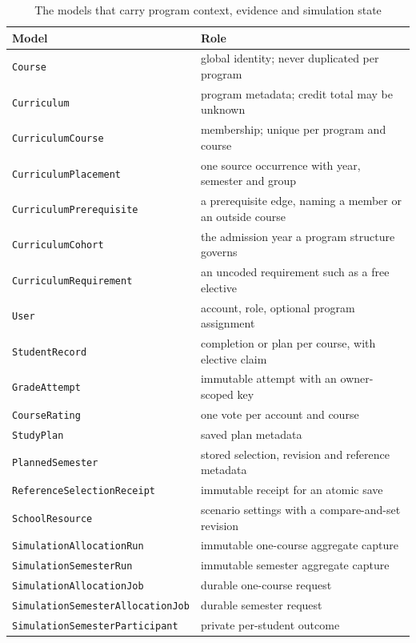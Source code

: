 \begin{table}[h]
\centering
\small
\begin{tabular}{p{}p{}}
\toprule
\textbf{Model} & \textbf{Role} \\
\midrule
{\tt Course} & global identity; never duplicated per program \\
{\tt Curriculum} & program metadata; credit total may be unknown \\
{\tt CurriculumCourse} & membership; unique per program and course \\
{\tt CurriculumPlacement} & one source occurrence with year, semester and group \\
{\tt CurriculumPrerequisite} & a prerequisite edge, naming a member or an outside course \\
{\tt CurriculumCohort} & the admission year a program structure governs \\
{\tt CurriculumRequirement} & an uncoded requirement such as a free elective \\
{\tt User} & account, role, optional program assignment \\
{\tt StudentRecord} & completion or plan per course, with elective claim \\
{\tt GradeAttempt} & immutable attempt with an owner-scoped key \\
{\tt CourseRating} & one vote per account and course \\
{\tt StudyPlan} & saved plan metadata \\
{\tt PlannedSemester} & stored selection, revision and reference metadata \\
{\tt ReferenceSelectionReceipt} & immutable receipt for an atomic save \\
{\tt SchoolResource} & scenario settings with a compare-and-set revision \\
{\tt SimulationAllocationRun} & immutable one-course aggregate capture \\
{\tt SimulationSemesterRun} & immutable semester aggregate capture \\
{\tt SimulationAllocationJob} & durable one-course request \\
{\tt SimulationSemesterAllocationJob} & durable semester request \\
{\tt SimulationSemesterParticipant} & private per-student outcome \\
\bottomrule
\end{tabular}
\caption{The models that carry program context, evidence and simulation state}
\end{table}

